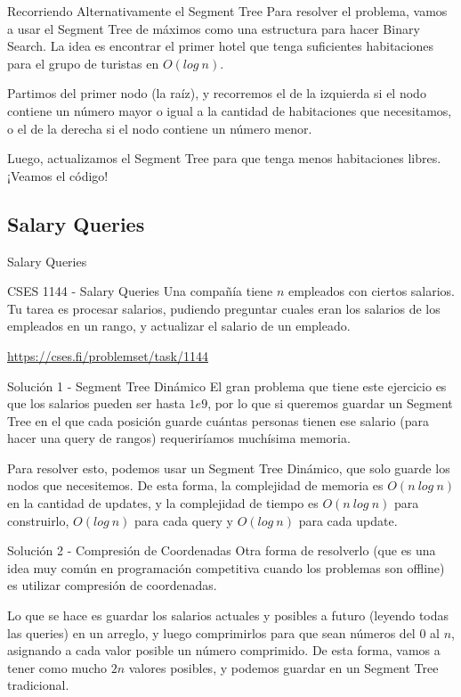 \documentclass{beamer}
\begin{document}
\begin{frame}{Recorriendo Alternativamente el Segment Tree}
Para resolver el problema, vamos a usar el Segment Tree de máximos como una estructura para hacer Binary Search. La idea es encontrar el primer hotel que tenga suficientes habitaciones para el grupo de turistas en $O(log\:n)$.

\pause
Partimos del primer nodo (la raíz), y recorremos el de la izquierda si el nodo contiene un número mayor o igual a la cantidad de habitaciones que necesitamos, o el de la derecha si el nodo contiene un número menor.

\pause
Luego, actualizamos el Segment Tree para que tenga menos habitaciones libres. ¡Veamos el código!
\end{frame}

\subsection{Salary Queries}
\begin{frame}{Salary Queries}
\begin{block}{CSES 1144 - Salary Queries}
Una compañía tiene $n$ empleados con ciertos salarios. Tu tarea es procesar salarios, pudiendo preguntar cuales eran los salarios de los empleados en un rango, y actualizar el salario de un empleado.
\end{block}

\url{https://cses.fi/problemset/task/1144}
\end{frame}

\begin{frame}{Solución 1 - Segment Tree Dinámico}
El gran problema que tiene este ejercicio es que los salarios pueden ser hasta $1e9$, por lo que si queremos guardar un Segment Tree en el que cada posición guarde cuántas personas tienen ese salario (para hacer una query de rangos) requeriríamos muchísima memoria.

\pause
Para resolver esto, podemos usar un Segment Tree Dinámico, que solo guarde los nodos que necesitemos. De esta forma, la complejidad de memoria es $O(n\:log\:n)$ en la cantidad de updates, y la complejidad de tiempo es $O(n\:log\:n)$ para construirlo, $O(log\:n)$ para cada query y $O(log\:n)$ para cada update.
\end{frame}

\begin{frame}{Solución 2 - Compresión de Coordenadas}
Otra forma de resolverlo (que es una idea muy común en programación competitiva cuando los problemas son offline) es utilizar compresión de coordenadas.

\pause
Lo que se hace es guardar los salarios actuales y posibles a futuro (leyendo todas las queries) en un arreglo, y luego comprimirlos para que sean números del $0$ al $n$, asignando a cada valor posible un número comprimido. De esta forma, vamos a tener como mucho $2n$ valores posibles, y podemos guardar en un Segment Tree tradicional.
\end{frame}
\end{document}
